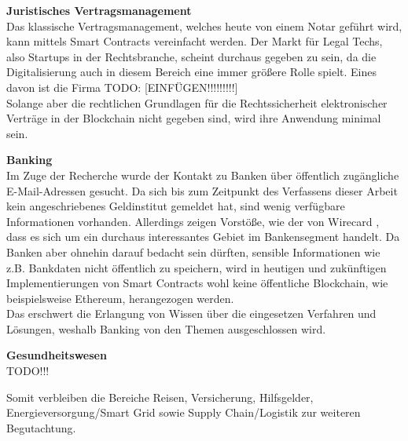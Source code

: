 \textbf{Juristisches Vertragsmanagement}\\
Das klassische Vertragsmanagement, welches heute von einem Notar geführt wird, kann mittels Smart Contracts vereinfacht werden. Der Markt für Legal Techs, also Startups in der Rechtsbranche, scheint durchaus gegeben zu sein, da die Digitalisierung auch in diesem Bereich eine immer größere Rolle spielt. Eines davon ist die Firma TODO: [EINFÜGEN!!!!!!!!!]\\
Solange aber die rechtlichen Grundlagen für die Rechtssicherheit elektronischer Verträge in der Blockchain nicht gegeben sind, wird ihre Anwendung minimal sein.


\textbf{Banking}\\
Im Zuge der Recherche wurde der Kontakt zu Banken über öffentlich zugängliche E-Mail-Adressen gesucht. Da sich bis zum Zeitpunkt des Verfassens dieser Arbeit kein angeschriebenes Geldinstitut gemeldet hat, sind wenig verfügbare Informationen vorhanden. Allerdings zeigen Vorstöße, wie der von Wirecard \cite[vgl.][]{Weidemann2018}, dass es sich um ein durchaus interessantes Gebiet im Bankensegment handelt. Da Banken aber ohnehin darauf bedacht sein dürften, sensible Informationen wie z.B. Bankdaten nicht öffentlich zu speichern, wird in heutigen und zukünftigen Implementierungen von Smart Contracts wohl keine öffentliche Blockchain, wie beispielsweise Ethereum, herangezogen werden. \\
Das erschwert die Erlangung von Wissen über die eingesetzen Verfahren und Lösungen, weshalb Banking von den Themen ausgeschlossen wird.

\textbf{Gesundheitswesen}\\
TODO!!!

Somit verbleiben die Bereiche Reisen, Versicherung, Hilfsgelder, Energieversorgung/Smart Grid sowie Supply Chain/Logistik zur weiteren Begutachtung.